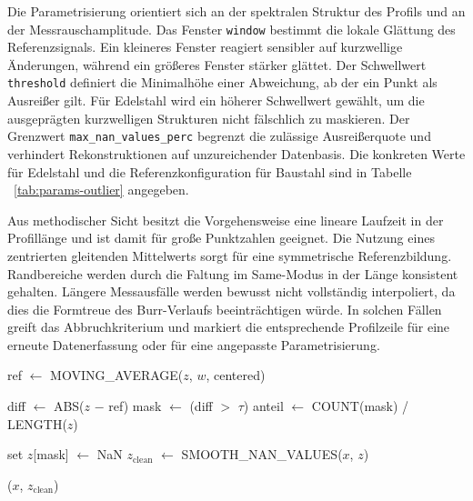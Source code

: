 Die Parametrisierung orientiert sich an der spektralen Struktur des Profils und an der Messrauschamplitude. Das Fenster \texttt{window} bestimmt die lokale Glättung des Referenzsignals. Ein kleineres Fenster reagiert sensibler auf kurzwellige Änderungen, während ein größeres Fenster stärker glättet. Der Schwellwert \texttt{threshold} definiert die Minimalhöhe einer Abweichung, ab der ein Punkt als Ausreißer gilt. Für Edelstahl wird ein höherer Schwellwert gewählt, um die ausgeprägten kurzwelligen Strukturen nicht fälschlich zu maskieren. Der Grenzwert \texttt{max\_nan\_values\_perc} begrenzt die zulässige Ausreißerquote und verhindert Rekonstruktionen auf unzureichender Datenbasis. Die konkreten Werte für Edelstahl und die Referenzkonfiguration für Baustahl sind in Tabelle ~\ref{tab:params-outlier} angegeben.

Aus methodischer Sicht besitzt die Vorgehensweise eine lineare Laufzeit in der Profil­länge und ist damit für große Punktzahlen geeignet. Die Nutzung eines zentrierten gleitenden Mittelwerts sorgt für eine symmetrische Referenzbildung. Randbereiche werden durch die Faltung im Same-Modus in der Länge konsistent gehalten. Längere Messausfälle werden bewusst nicht vollständig interpoliert, da dies die Formtreue des Burr-Verlaufs beeinträchtigen würde. In solchen Fällen greift das Abbruchkriterium und markiert die entsprechende Profilzeile für eine erneute Datenerfassung oder für eine angepasste Parametrisierung.

\begin{algorithm}[H]
\DontPrintSemicolon
\caption{Einfache Ausreißer-Korrektur im Burr-Profil \,(vgl. Parameter in Tabelle ~\ref{tab:params-outlier})}
\label{alg:simple-burr}

ref $\leftarrow$ MOVING\_AVERAGE($z$, $w$, centered)\;   %

diff $\leftarrow$ ABS($z$ $-$ ref)\;
mask $\leftarrow$ (diff $>$ $\tau$)\;
anteil $\leftarrow$ COUNT(mask) / LENGTH($z$)\;


set $z$[mask] $\leftarrow$ NaN\;
$z_{\text{clean}}$ $\leftarrow$ SMOOTH\_NAN\_VALUES($x$, $z$)\; %

\Return ($x$, $z_{\text{clean}}$)
\end{algorithm}

